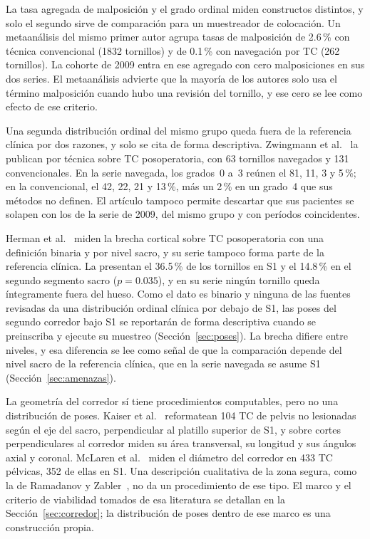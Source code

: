 La tasa agregada de malposición y el grado ordinal miden constructos distintos, y solo el segundo sirve de comparación para un muestreador de colocación. Un metaanálisis del mismo primer autor \cite{zwingmann2013} agrupa tasas de malposición de 2.6\,\% con técnica convencional (1832 tornillos) y de 0.1\,\% con navegación por TC (262 tornillos). La cohorte de 2009 entra en ese agregado con cero malposiciones en sus dos series. El metaanálisis advierte que la mayoría de los autores solo usa el término malposición cuando hubo una revisión del tornillo, y ese cero se lee como efecto de ese criterio.

Una segunda distribución ordinal del mismo grupo queda fuera de la referencia clínica por dos razones, y solo se cita de forma descriptiva. Zwingmann et al.~\cite{zwingmann2010percutaneous} la publican por técnica sobre TC posoperatoria, con 63 tornillos navegados y 131 convencionales. En la serie navegada, los grados~0 a~3 reúnen el 81, 11, 3 y 5\,\%; en la convencional, el 42, 22, 21 y 13\,\%, más un 2\,\% en un grado~4 que sus métodos no definen. El artículo tampoco permite descartar que sus pacientes se solapen con los de la serie de 2009, del mismo grupo y con períodos coincidentes.

Herman et al.~\cite{herman2016} miden la brecha cortical sobre TC posoperatoria con una definición binaria y por nivel sacro, y su serie tampoco forma parte de la referencia clínica. La presentan el 36.5\,\% de los tornillos en S1 y el 14.8\,\% en el segundo segmento sacro ($p = 0.035$), y en su serie ningún tornillo queda íntegramente fuera del hueso. Como el dato es binario y ninguna de las fuentes revisadas da una distribución ordinal clínica por debajo de S1, las poses del segundo corredor bajo S1 se reportarán de forma descriptiva cuando se preinscriba y ejecute su muestreo (Sección~\ref{sec:poses}). La brecha difiere entre niveles, y esa diferencia se lee como señal de que la comparación depende del nivel sacro de la referencia clínica, que en la serie navegada se asume S1 (Sección~\ref{sec:amenazas}).

La geometría del corredor sí tiene procedimientos computables, pero no una distribución de poses. Kaiser et al.~\cite{kaiser2014dysmorphism} reformatean 104 TC de pelvis no lesionadas según el eje del sacro, perpendicular al platillo superior de S1, y sobre cortes perpendiculares al corredor miden su área transversal, su longitud y sus ángulos axial y coronal. McLaren et al.~\cite{mclaren2021corridor} miden el diámetro del corredor en 433 TC pélvicas, 352 de ellas en S1. Una descripción cualitativa de la zona segura, como la de Ramadanov y Zabler~\cite{ramadanov2025safezone}, no da un procedimiento de ese tipo. El marco y el criterio de viabilidad tomados de esa literatura se detallan en la Sección~\ref{sec:corredor}; la distribución de poses dentro de ese marco es una construcción propia.

